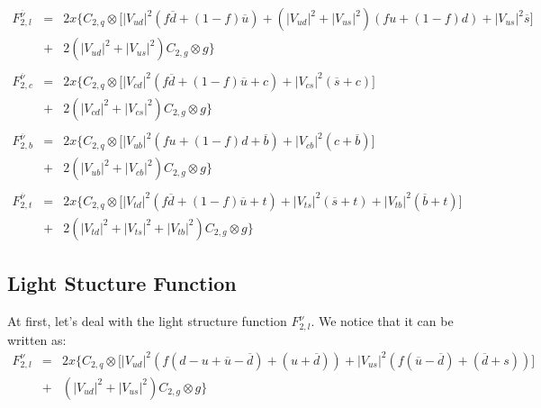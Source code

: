\documentclass[10pt,a4paper]{article}
\begin{document}
\begin{equation}
\begin{array}{rcl}  
F_{2,l}^{\overline\nu} &=& 2x\Big\{C_{2,q}\otimes\Big[|V_{ud}|^2 (f\overline{d}+(1-f)\overline{u}) +\left(|V_{ud}|^2+|V_{us}|^2\right)(fu+(1-f)d) + |V_{us}|^2 \overline{s}\Big]\\
              &+& 2\left(|V_{ud}|^2+|V_{us}|^2\right)C_{2,g}\otimes g\Big\}\\
\\
F_{2,c}^{\overline\nu} &=& 2x\Big\{C_{2,q}\otimes\Big[|V_{cd}|^2(f\overline{d}+(1-f)\overline{u}+c) + |V_{cs}|^2 (\overline{s}+c)\Big]\\
              &+& 2\left(|V_{cd}|^2+|V_{cs}|^2\right)C_{2,g}\otimes g\Big\}\\
\\
F_{2,b}^{\overline\nu} &=& 2x\Big\{C_{2,q}\otimes\Big[|V_{ub}|^2 (fu+(1-f)d+\overline{b}) + |V_{cb}|^2 (c+\overline{b})\Big]\\
              &+& 2\left(|V_{ub}|^2+|V_{cb}|^2\right)C_{2,g}\otimes g\Big\}\\
\\
F_{2,t}^{\overline\nu} &=& 2x\Big\{C_{2,q}\otimes\Big[|V_{td}|^2 (f\overline{d}+(1-f)\overline{u} +t)+ |V_{ts}|^2(\overline{s}+t) + |V_{tb}|^2(\overline{b}+t)\Big]\\
              &+& 2\left(|V_{td}|^2 + |V_{ts}|^2 + |V_{tb}|^2\right)C_{2,g}\otimes g\Big\}
\end{array}
\end{equation}


\subsection{Light Stucture Function}

At first, let's deal with the light structure function
$F_{2,l}^{\nu}$. We notice that it can be written as:
\begin{equation}
\begin{array}{rcl}  
F_{2,l}^{\nu} &=& 2x\Big\{C_{2,q}\otimes\Big[|V_{ud}|^2 \left(f(d-u+\overline{u}-\overline{d})+(u+\overline{d})\right) +|V_{us}|^2\left(f(\overline{u}-\overline{d})+(\overline{d}+s)\right)\Big]\\
              &+& \left(|V_{ud}|^2+|V_{us}|^2\right)C_{2,g}\otimes g\Big\}\\
\end{array}
\end{equation}
\end{document}
